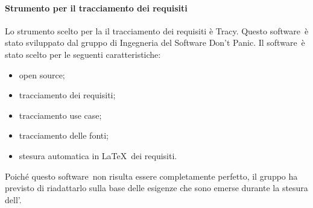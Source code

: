 \documentclass[../NormeProgetto.tex]{subfiles}
\begin{document}
			\paragraph{Strumento per il tracciamento dei requisiti}
			Lo strumento scelto per la il tracciamento dei requisiti è Tracy\g. Questo software\g\ è stato sviluppato dal gruppo di Ingegneria del Software Don't Panic. Il software\g\ è stato scelto per le seguenti caratteristiche:
			\begin{itemize}
				\item open source\g;
				\item tracciamento dei requisiti;
				\item tracciamento use case;
				\item tracciamento delle fonti;
				\item stesura automatica in \LaTeX\g\ dei requisiti.
			\end{itemize}
                        Poiché questo software\g\ non risulta essere completamente perfetto, il gruppo ha previsto di riadattarlo
 sulla base delle esigenze che sono emerse durante la stesura dell'\analisideirequisiti.
			
\end{document}
